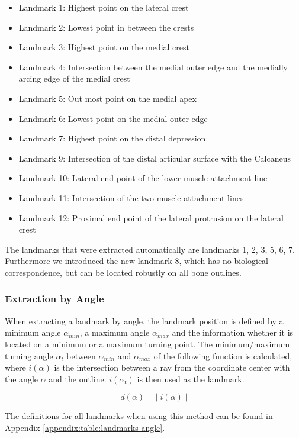 \documentclass[pdftex,12pt,a4paper]{report}
\begin{document}
\begin{itemize}
\item Landmark 1: Highest point on the lateral crest
\item Landmark 2: Lowest point in between the crests
\item Landmark 3: Highest point on the medial crest
\item Landmark 4: Intersection between the medial outer edge and the medially arcing edge of the medial crest
\item Landmark 5: Out most point on the medial apex
\item Landmark 6: Lowest point on the medial outer edge
\item Landmark 7: Highest point on the distal depression
\item Landmark 9: Intersection of the distal articular surface with the Calcaneus
\item Landmark 10: Lateral end point of the lower muscle attachment line
\item Landmark 11: Intersection of the two muscle attachment lines
\item Landmark 12: Proximal end point of the lateral protrusion on the lateral crest
\end{itemize}

The landmarks that were extracted automatically are landmarks 1, 2, 3, 5, 6, 7. Furthermore we introduced the new
landmark 8, which has no biological correspondence, but can be located robustly on all bone outlines.

\subsubsection{Extraction by Angle}

When extracting a landmark by angle, the landmark position is defined by a minimum angle $\alpha_{min}$, a maximum
angle $\alpha_{max}$ and the information whether it is located on a minimum or a maximum turning point.
The minimum/maximum turning angle $\alpha_{t}$ between $\alpha_{min}$ and $\alpha_{max}$ of the following function
is calculated, where $i(\alpha)$ is the intersection between a ray from the coordinate center with the angle $\alpha$ and
the outline. $i(\alpha_t)$ is then used as the landmark.

\begin{equation}
d(\alpha) = ||i(\alpha)||
\end{equation}

The definitions for all landmarks when using this method can be found in Appendix \ref{appendix:table:landmarks-angle}.
\end{document}

